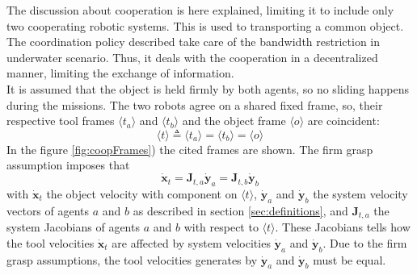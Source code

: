 The discussion about cooperation is here explained, limiting it to include only two cooperating robotic systems. This is used to transporting a common object. The coordination policy described take care of the bandwidth restriction in underwater scenario. Thus, it deals with the cooperation in a decentralized manner, limiting the exchange of information.\\
It is assumed that the object is held firmly by both agents, so no sliding happens during the missions. The two robots agree on a shared fixed frame, so, their respective tool frames $\langle t_a \rangle$ and $\langle t_b \rangle$ and the object frame $\langle o \rangle$ are coincident: 
\begin{equation*} 
\langle t \rangle \triangleq \langle t_a \rangle = \langle t_b \rangle = \langle o \rangle
\end{equation*}
In the figure \ref{fig:coopFrames}) the cited frames are shown.
The firm grasp assumption imposes that
\begin{equation}\label{eq:coopintro}
	\dot{\boldsymbol{x}}_t = \boldsymbol{J}_{t,a} \dot{\boldsymbol{y}}_a = \boldsymbol{J}_{t,b} \dot{\boldsymbol{y}}_b
\end{equation}
with $\dot{\boldsymbol{x}}_t$ the object velocity with component on $\langle t \rangle$, $\dot{\boldsymbol{y}}_a$ and $\dot{\boldsymbol{y}}_b$ the system velocity vectors of agents $a$ and $b$ as described in section \ref{sec:definitions}, and $\boldsymbol{J}_{t,a}$ the system Jacobians of agents $a$ and $b$ with respect to $\langle t \rangle$. These Jacobians tells how the tool velocities $\dot{\boldsymbol{x}}_t$ are affected by system velocities $\dot{\boldsymbol{y}}_a$ and $\dot{\boldsymbol{y}}_b$. Due to the firm grasp assumptions, the tool velocities generates by $\dot{\boldsymbol{y}}_a$ and $\dot{\boldsymbol{y}}_b$ must be equal.\\


